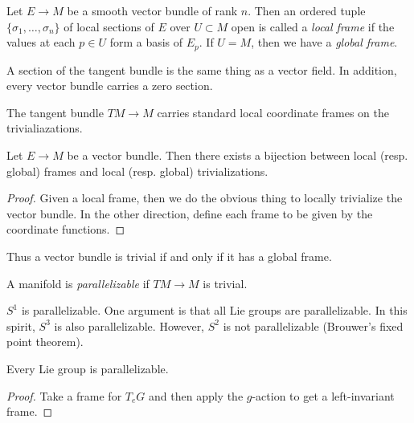 \documentclass[twoside, 10pt]{article}
\begin{document}
    \begin{defn} Let $E \to M$ be a smooth vector bundle of rank $n$. Then an
        ordered tuple $\{\sigma_1, \ldots, \sigma_n\}$ of local sections of $E$
        over $U \subset M$ open is called a \textit{local frame} if the values
        at each $p \in U$ form a basis of $E_p$. If $U = M$, then we have a
        \textit{global frame}.  \end{defn}

    \begin{exm} A section of the tangent bundle is the same thing as a vector
    field. In addition, every vector bundle carries a zero section.  \end{exm}

    \begin{exm} The tangent bundle $TM \to M$ carries standard local coordinate
    frames on the trivialiazations.  \end{exm}
    
    \begin{prop} Let $E \to M$ be a vector bundle. Then there exists a
    bijection between local (resp. global) frames and local (resp. global)
trivializations.  \end{prop}

    \begin{proof} Given a local frame, then we do the obvious thing to locally
    trivialize the vector bundle. In the other direction, define each frame to
be given by the coordinate functions.  \end{proof}

    Thus a vector bundle is trivial if and only if it has a global frame.

    \begin{defn} A manifold is \textit{parallelizable} if $TM \to M$ is
    trivial.  \end{defn}

    \begin{exm} $S^1$ is parallelizable. One argument is that all Lie groups
    are parallelizable. In this spirit, $S^3$ is also parallelizable. However,
$S^2$ is not parallelizable (Brouwer's fixed point theorem).  \end{exm}

    \begin{prop} Every Lie group is parallelizable.  \end{prop}

    \begin{proof} Take a frame for $T_eG$ and then apply the $g$-action to get
    a left-invariant frame.  \end{proof}
\end{document}
